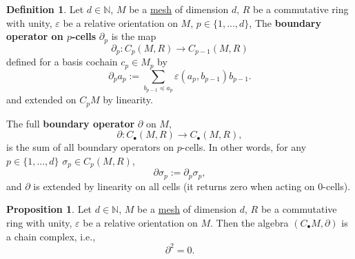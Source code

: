 \documentclass[fleqn]{article}
\theoremstyle{definition}
\newtheorem{proposition}[theorem]{Proposition}
\newtheorem{definition}[theorem]{Definition}
\newcommand{\N}{\mathbb{N}}
\begin{document}
\begin{definition}
  Let
    $d \in \N$,
    $M$ be a \hyperref[idec:mesh:definition]{mesh} of dimension $d$,
    $R$ be a commutative ring with unity,
    $\varepsilon$ be a relative orientation on $M$,
    $p \in \{1, ..., d\}$,
  The \textbf{boundary operator on $p$-cells} $\partial_p$ is the map
  \begin{equation}
     \partial_p \colon C_p(M, R) \to C_{p - 1}(M, R)
  \end{equation}
  defined for a basis cochain $c_p \in M_p$ by
  \begin{equation}
    \partial_p a_p
    := \sum_{b_{p - 1} \preceq a_p} \varepsilon(a_p, b_{p - 1}) b_{p - 1}.
  \end{equation}
  and extended on $C_p M$ by linearity.

  The full \textbf{boundary operator} $\partial$ on $M$,
  \begin{equation}
    \partial \colon C_\bullet(M, R) \to C_\bullet(M, R),
  \end{equation}
  is the sum of all boundary operators on $p$-cells.
  In other words, for any $p \in \{1, ..., d\}$ $\sigma_p \in C_p(M, R)$,
  \begin{equation}
    \partial \sigma_p := \partial_p \sigma_p,
  \end{equation}
  and $\partial$ is extended by linearity on all cells
  (it returns zero when acting on $0$-cells).
\end{definition}

\begin{proposition}
  Let
    $d \in \N$,
    $M$ be a \hyperref[idec:mesh:definition]{mesh} of dimension $d$,
    $R$ be a commutative ring with unity,
    $\varepsilon$ be a relative orientation on $M$.
  Then the algebra $(C_\bullet M, \partial)$ is a chain complex, i.e.,
  \begin{equation}
    \partial^2 = 0.
  \end{equation}
\end{proposition}
\end{document}
